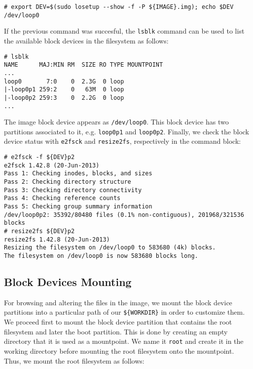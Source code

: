 \begin{lstlisting}[]
# export DEV=$(sudo losetup --show -f -P ${IMAGE}.img); echo $DEV
/dev/loop0
\end{lstlisting}
\FloatBarrier
\vspace{-5mm}

If the previous command was succesful, the \texttt{lsblk} command can be used
to list the available block devices in the filesystem as follows:

\begin{lstlisting}[]
# lsblk
NAME      MAJ:MIN RM  SIZE RO TYPE MOUNTPOINT
...
loop0       7:0    0  2.3G  0 loop
|-loop0p1 259:2    0   63M  0 loop
|-loop0p2 259:3    0  2.2G  0 loop
...
\end{lstlisting}
\FloatBarrier
\vspace{-5mm}

The image block device appears as \texttt{/dev/loop0}. This block device has
two partitions associated to it, e.g. \texttt{loop0p1} and \texttt{loop0p2}.
Finally, we check the block device status with \texttt{e2fsck} and
\texttt{resize2fs}, respectively in the command block:

\begin{lstlisting}[]
# e2fsck -f ${DEV}p2
e2fsck 1.42.8 (20-Jun-2013)
Pass 1: Checking inodes, blocks, and sizes
Pass 2: Checking directory structure
Pass 3: Checking directory connectivity
Pass 4: Checking reference counts
Pass 5: Checking group summary information
/dev/loop0p2: 35392/80480 files (0.1% non-contiguous), 201968/321536 blocks
# resize2fs ${DEV}p2
resize2fs 1.42.8 (20-Jun-2013)
Resizing the filesystem on /dev/loop0 to 583680 (4k) blocks.
The filesystem on /dev/loop0 is now 583680 blocks long.
\end{lstlisting}
\FloatBarrier

\subsection{Block Devices Mounting}
For browsing and altering the files in the image, we mount the block
device partitions into a particular path of our \texttt{\$\{WORKDIR\}} in order
to customize them. We proceed first to mount the block device partition that
contains the root filesystem and later the boot partition. This is done by
creating an empty directory that it is used as a mountpoint. We name it
\texttt{root} and create it in the working directory before mounting the
root filesystem onto the mountpoint. Thus, we mount the root filesystem
as follows:

